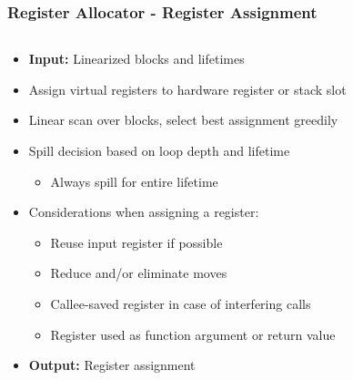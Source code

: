 \documentclass[navbaroff,en]{sdqbeamer}
\begin{document}
\begin{frame}
\frametitle{Register Allocator - Register Assignment}

\begin{columns}
	\begin{column}{0.7\textwidth}
		\begin{itemize}
			\item \textbf{Input:} Linearized blocks and lifetimes
			\item Assign virtual registers to hardware register or stack slot
			\item Linear scan over blocks, select best assignment greedily
			\item Spill decision based on loop depth and lifetime 
			\begin{itemize}
				\item Always spill for entire lifetime
			\end{itemize}
			\item Considerations when assigning a register:
			\begin{itemize}
				\item Reuse input register if possible
				\item Reduce and/or eliminate moves
				\item Callee-saved register in case of interfering calls
				\item Register used as function argument or return value
			\end{itemize}
			\item \textbf{Output:} Register assignment
		\end{itemize}
	\end{column}
	

\end{columns}
\end{frame}
\end{document}
